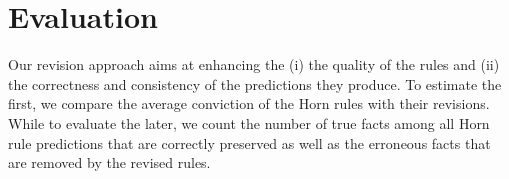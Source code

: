 \chapter{Evaluation}
\label{sec:eval}











Our revision approach aims at enhancing the (i) the quality of the rules and (ii) the correctness and consistency of the predictions they produce. To estimate the first, we compare the average conviction of the Horn rules with their revisions.
While to evaluate the later, we count the number of true facts among all Horn rule predictions that are correctly preserved as well as the erroneous facts that are removed by the revised rules.  

